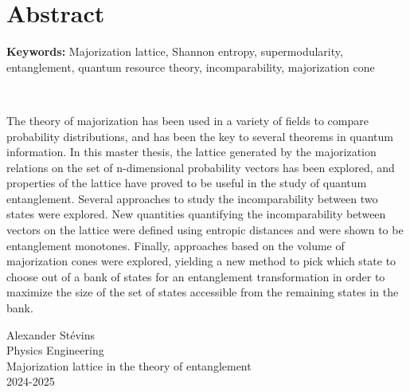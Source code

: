 \chapter*{Abstract}


\textbf{Keywords:} Majorization lattice, Shannon entropy, supermodularity, entanglement, quantum resource theory, incomparability, majorization cone

~

The theory of majorization has been used in a variety of fields to compare probability distributions, and has been the key to several theorems in quantum information. In this master thesis, the lattice generated by the majorization relations on the set of n-dimensional probability vectors has been explored, and properties of the lattice have proved to be useful in the study of quantum entanglement. Several approaches to study the incomparability between two states were explored. New quantities quantifying the incomparability between vectors on the lattice were defined using entropic distances and were shown to be entanglement monotones. Finally, approaches based on the volume of majorization cones were explored, yielding a new method to pick which state to choose out of a bank of states for an entanglement transformation in order to maximize the size of the set of states accessible from the remaining states in the bank.

\vspace*{\fill}
\noindent Alexander Stévins\\
Physics Engineering\\
Majorization lattice in the theory of entanglement\\
2024-2025
